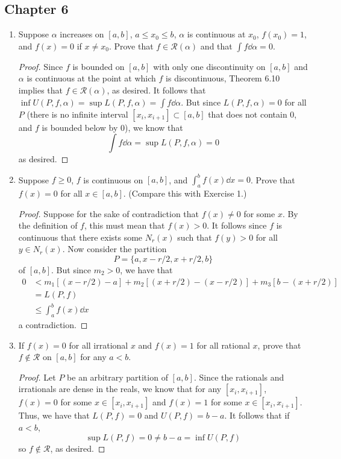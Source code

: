 \documentclass[../psets.tex]{subfiles}
\begin{document}
\subsection*{Chapter 6}
\begin{enumerate}[label={\textbf{\arabic*.}}]
    \item Suppose $\alpha$ increases on $[a,b]$, $a\leq x_0\leq b$, $\alpha$ is continuous at $x_0$, $f(x_0)=1$, and $f(x)=0$ if $x\neq x_0$. Prove that $f\in\mathscr{R}(\alpha)$ and that $\int f\dd{\alpha}=0$.
    \begin{proof}
        Since $f$ is bounded on $[a,b]$ with only one discontinuity on $[a,b]$ and $\alpha$ is continuous at the point at which $f$ is discontinuous, Theorem 6.10 implies that $f\in\mathscr{R}(\alpha)$, as desired. It follows that $\inf U(P,f,\alpha)=\sup L(P,f,\alpha)=\int f\dd{\alpha}$. But since $L(P,f,\alpha)=0$ for all $P$ (there is no infinite interval $[x_i,x_{i+1}]\subset[a,b]$ that does not contain 0, and $f$ is bounded below by 0), we know that
        \begin{equation*}
            \int f\dd{\alpha} = \sup L(P,f,\alpha)
            = 0
        \end{equation*}
        as desired.
    \end{proof}
    \item Suppose $f\geq 0$, $f$ is continuous on $[a,b]$, and $\int_a^bf(x)\dd{x}=0$. Prove that $f(x)=0$ for all $x\in[a,b]$. (Compare this with Exercise 1.)
    \begin{proof}
        Suppose for the sake of contradiction that $f(x)\neq 0$ for some $x$. By the definition of $f$, this must mean that $f(x)>0$. It follows since $f$ is continuous that there exists some $N_r(x)$ such that $f(y)>0$ for all $y\in N_r(x)$. Now consider the partition
        \begin{equation*}
            P = \{a,x-r/2,x+r/2,b\}
        \end{equation*}
        of $[a,b]$. But since $m_2>0$, we have that
        \begin{align*}
            0 &< m_1[(x-r/2)-a]+m_2[(x+r/2)-(x-r/2)]+m_3[b-(x+r/2)]\\
            &= L(P,f)\\
            &\leq \int_a^bf(x)\dd{x}\tag*{Theorem 6.4}
        \end{align*}
        a contradiction.
    \end{proof}
    \item If $f(x)=0$ for all irrational $x$ and $f(x)=1$ for all rational $x$, prove that $f\notin\mathscr{R}$ on $[a,b]$ for any $a<b$.
    \begin{proof}
        Let $P$ be an arbitrary partition of $[a,b]$. Since the rationals and irrationals are dense in the reals, we know that for any $[x_i,x_{i+1}]$, $f(x)=0$ for some $x\in[x_i,x_{i+1}]$ and $f(x)=1$ for some $x\in[x_i,x_{i+1}]$. Thus, we have that $L(P,f)=0$ and $U(P,f)=b-a$. It follows that if $a<b$,
        \begin{equation*}
            \sup L(P,f) = 0 \neq b-a = \inf U(P,f)
        \end{equation*}
        so $f\notin\mathscr{R}$, as desired.
    \end{proof}
\end{enumerate}
\end{document}

